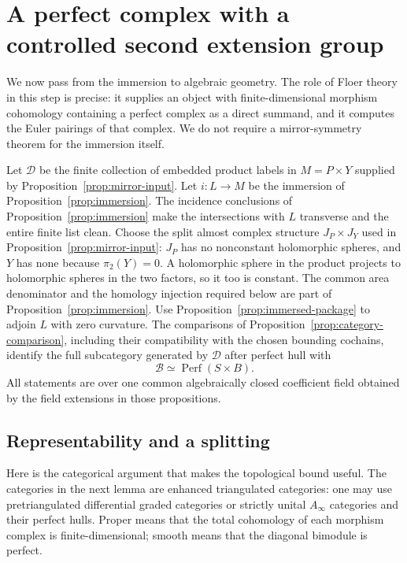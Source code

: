 \documentclass[11pt]{article}
\numberwithin{equation}{section}
\theoremstyle{definition}
\theoremstyle{remark}
\begin{document}
\section{A perfect complex with a controlled second extension group}
\label{sec:perfect}

We now pass from the immersion to algebraic geometry.  The role of Floer
theory in this step is precise: it supplies an object with finite-dimensional
morphism cohomology containing a perfect complex as a direct summand,
and it computes the
Euler pairings of that complex.  We do not require a mirror-symmetry
theorem for the immersion itself.

Let $\mathcal D$ be the finite collection of embedded product labels in
$M=P\times Y$ supplied by Proposition~\ref{prop:mirror-input}.  Let
$i:L\to M$ be the immersion of Proposition~\ref{prop:immersion}.
The incidence conclusions of Proposition~\ref{prop:immersion} make
the intersections with $L$ transverse and the entire finite list clean.
Choose the split almost complex structure $J_P\times J_Y$ used in
Proposition~\ref{prop:mirror-input}: $J_P$ has no nonconstant holomorphic
spheres, and $Y$ has none because $\pi_2(Y)=0$.  A holomorphic sphere
in the product projects to holomorphic spheres in the two factors,
so it too is constant.  The common area denominator and the homology
injection required below are part of Proposition~\ref{prop:immersion}.
Use Proposition~\ref{prop:immersed-package} to adjoin
$L$ with zero curvature.  The comparisons of
Proposition~\ref{prop:category-comparison}, including their compatibility
with the chosen bounding cochains, identify the full subcategory
generated by $\mathcal D$ after perfect hull with
\[
                  \mathcal B\simeq\operatorname{Perf}(S\times B).
\]
All statements are over one common algebraically closed coefficient field
obtained by the field extensions in those propositions.

\subsection{Representability and a splitting}

Here is the categorical argument that makes the topological bound useful.
The categories in the next lemma are enhanced triangulated categories:
one may use pretriangulated differential graded categories or strictly
unital $A_\infty$ categories and their perfect hulls.  Proper means that
the total cohomology of each morphism complex is finite-dimensional;
smooth means that the diagonal bimodule is perfect.
\end{document}
